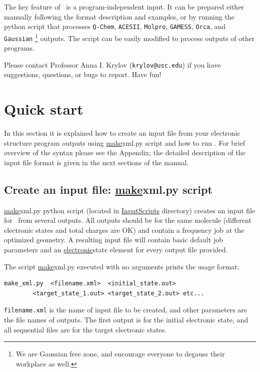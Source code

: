 \documentclass[11pt]{article}
\begin{document}
The key feature of \ezFCF\ is a program-independent \xml input. 
It can be prepared either manually following the format description and examples, 
or by running the python script that processes 
{\tt Q-Chem}, {\tt ACESII}, {\tt Molpro}, {\tt GAMESS}, {\tt Orca}, and {\tt Gaussian}
\footnote{We are Gaussian free zone, and encourage everyone to degauss their workplace as well.} outputs.
The script can be easily modified to process outputs of other programs. 
 
Please contact Professor Anna I. Krylov ({\tt krylov@usc.edu})
if you have suggestions, questions, or bugs to report. Have fun!  

\section{Quick start}

In this section it is explained how to create an input \xml file from your electronic structure 
program outputs using \ul{make}{xml.py} script and how to run \ezFCF.
For brief overview of the \xml syntax please see the Appendix;
the detailed description of the input file format is given in the  
next sections of the manual.

\subsection{Create an input file: \ul{make}{xml.py} script}
\label{sec:script}

\ul{make}{xml.py} python script (located in \ul{InputScripts} directory)
creates an \xml input file for \ezFCF\ from several \ai outputs. 
All \ai outputs should be for the same molecule (different electronic states and total charges are OK) 
and contain a frequency job at the optimized geometry. 
A resulting \xml input file will contain basic default job parameters and an \ul{electronic}{state} element 
for every output file provided. 

The script \ul{make}{xml.py} executed with no arguments prints the usage format:
\begin{lstlisting}[frame=single,framerule=0pt]
  make_xml.py  <filename.xml>  <initial_state.out>
        <target_state_1.out> <target_state_2.out> etc...
\end{lstlisting}
{\tt filename.xml} is the name of \xml input file to be  created,
and other parameters are the file names of \ai outputs.
The first output is for the initial electronic state,
and all sequential files are for the target electronic states.
\end{document}
